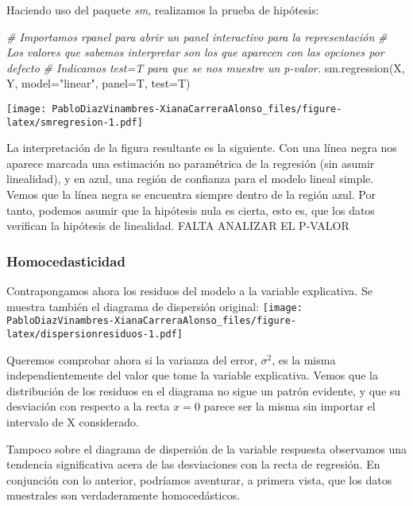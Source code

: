 \documentclass[
]{article}
\newenvironment{Shaded}{\begin{snugshade}}{\end{snugshade}}
\newcommand{\AttributeTok}[1]{\textcolor[rgb]{0.77,0.63,0.00}{#1}}
\newcommand{\CommentTok}[1]{\textcolor[rgb]{0.56,0.35,0.01}{\textit{#1}}}
\newcommand{\FunctionTok}[1]{\textcolor[rgb]{0.00,0.00,0.00}{#1}}
\newcommand{\NormalTok}[1]{#1}
\newcommand{\StringTok}[1]{\textcolor[rgb]{0.31,0.60,0.02}{#1}}
\begin{document}
Haciendo uso del paquete \emph{sm}, realizamos la prueba de hipótesis:

\begin{Shaded}
\begin{Highlighting}[]
\CommentTok{\# Importamos rpanel para abrir un panel interactivo para la representación}
\CommentTok{\# Los valores que sabemos interpretar son los que aparecen con las opciones por defecto}
\CommentTok{\# Indicamos test=T para que se nos muestre un p{-}valor.}
\FunctionTok{sm.regression}\NormalTok{(X, Y, }\AttributeTok{model=}\StringTok{"linear"}\NormalTok{, }\AttributeTok{panel=}\NormalTok{T, }\AttributeTok{test=}\NormalTok{T)}
\end{Highlighting}
\end{Shaded}

\texttt{[image: PabloDiazVinambres-XianaCarreraAlonso\_files/figure-latex/smregresion-1.pdf]}

La interpretación de la figura resultante es la siguiente. Con una línea
negra nos aparece marcada una estimación no paramétrica de la regresión
(sin asumir linealidad), y en azul, una región de confianza para el
modelo lineal simple. Vemos que la línea negra se encuentra siempre
dentro de la región azul. Por tanto, podemos asumir que la hipótesis
nula es cierta, esto es, que los datos verifican la hipótesis de
linealidad. FALTA ANALIZAR EL P-VALOR

\hypertarget{homocedasticidad}{%
\subsubsection{Homocedasticidad}\label{homocedasticidad}}

Contrapongamos ahora los residuos del modelo a la variable explicativa.
Se muestra también el diagrama de dispersión original:
\texttt{[image: PabloDiazVinambres-XianaCarreraAlonso\_files/figure-latex/dispersionresiduos-1.pdf]}

Queremos comprobar ahora si la varianza del error, \(\sigma^2\), es la
misma independientemente del valor que tome la variable explicativa.
Vemos que la distribución de los residuos en el diagrama no sigue un
patrón evidente, y que su desviación con respecto a la recta \(x=0\)
parece ser la misma sin importar el intervalo de X considerado.

Tampoco sobre el diagrama de dispersión de la variable respuesta
observamos una tendencia significativa acera de las desviaciones con la
recta de regresión. En conjunción con lo anterior, podríamos aventurar,
a primera vista, que los datos muestrales son verdaderamente
homocedásticos.
\end{document}
